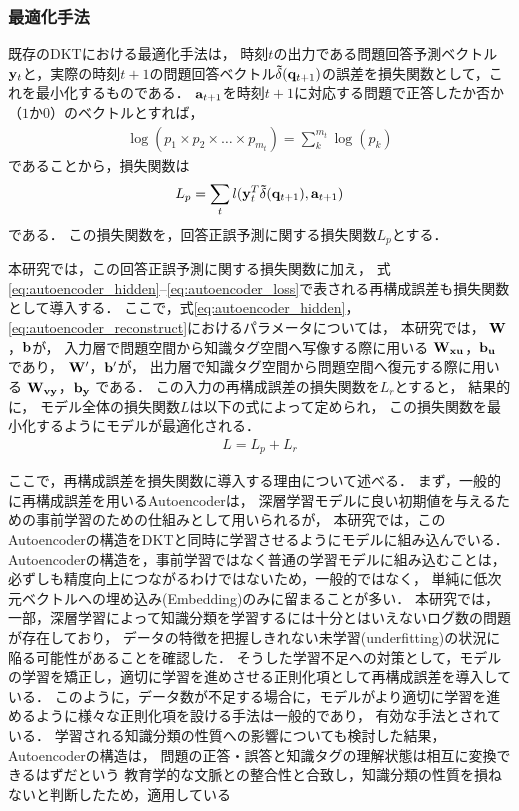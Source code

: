 \subsubsection{最適化手法}
既存のDKTにおける最適化手法は，
時刻$t$の出力である問題回答予測ベクトル${\bf y}_t$と，実際の時刻$t+1$の問題回答ベクトル${\bf\tilde{ \delta}}({\bf q}_{t+1})$の誤差を損失関数として，これを最小化するものである．
${\bf a}_{t+1}$を時刻$t+1$に対応する問題で正答したか否か（$1$か$0$）のベクトルとすれば，
\begin{eqnarray}
\label{eq:log_sum}
{\log(p_1 \times p_2 \times \dots \times p_{m_t}) = \sum_{k}^{m_t} \log(p_k)}
\end{eqnarray}
であることから，損失関数は
\begin{eqnarray}
\label{eq:prediction_entropy}
{L_p = \sum_t l({\bf y}_t^T {\bf \tilde{\delta}}({\bf q}_{t+1}), {\bf a}_{t+1})}
\end{eqnarray}
である．
この損失関数を，回答正誤予測に関する損失関数$L_p$とする．


本研究では，この回答正誤予測に関する損失関数に加え，
式\ref{eq:autoencoder_hidden}--\ref{eq:autoencoder_loss}で表される再構成誤差も損失関数として導入する．
ここで，式\ref{eq:autoencoder_hidden}，\ref{eq:autoencoder_reconstruct}におけるパラメータについては，
本研究では，
${\bf W}$，${\bf b}$が，
入力層で問題空間から知識タグ空間へ写像する際に用いる
${\bf W_{xu}}$，${\bf b_u}$
であり，
${\bf W'}$，${\bf b'}$が，
出力層で知識タグ空間から問題空間へ復元する際に用いる
${\bf W_{vy}}$，${\bf b_y}$
である．
この入力の再構成誤差の損失関数を$L_r$とすると，
結果的に，
モデル全体の損失関数$L$は以下の式によって定められ，
この損失関数を最小化するようにモデルが最適化される．
\begin{eqnarray}
\label{eq:total_loss}
{L = L_p + L_r}
\end{eqnarray}


ここで，再構成誤差を損失関数に導入する理由について述べる．
まず，一般的に再構成誤差を用いるAutoencoderは，
深層学習モデルに良い初期値を与えるための事前学習のための仕組みとして用いられるが，
本研究では，このAutoencoderの構造をDKTと同時に学習させるようにモデルに組み込んでいる．
Autoencoderの構造を，事前学習ではなく普通の学習モデルに組み込むことは，
必ずしも精度向上につながるわけではないため，一般的ではなく，
単純に低次元ベクトルへの埋め込み(Embedding)のみに留まることが多い．
本研究では，
一部，深層学習によって知識分類を学習するには十分とはいえないログ数の問題が存在しており，
データの特徴を把握しきれない未学習(underfitting)の状況に陥る可能性があることを確認した．
そうした学習不足への対策として，モデルの学習を矯正し，適切に学習を進めさせる正則化項として再構成誤差を導入している．
このように，データ数が不足する場合に，モデルがより適切に学習を進めるように様々な正則化項を設ける手法は一般的であり，
有効な手法とされている．
学習される知識分類の性質への影響についても検討した結果，
Autoencoderの構造は，
問題の正答・誤答と知識タグの理解状態は相互に変換できるはずだという
教育学的な文脈との整合性と合致し，知識分類の性質を損ねないと判断したため，適用している



